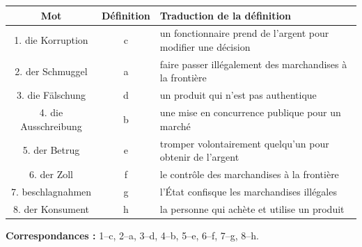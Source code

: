 \documentclass[11pt]{article}
\begin{document}
\begin{corrige}
\begin{center}
\begin{tabular}{|c|c|l|}
\hline
\rowcolor{popblueL} Mot & Définition & Traduction de la définition \\
\hline
1. die Korruption & c & un fonctionnaire prend de l'argent pour modifier une décision \\
\hline
2. der Schmuggel & a & faire passer illégalement des marchandises à la frontière \\
\hline
3. die Fälschung & d & un produit qui n'est pas authentique \\
\hline
4. die Ausschreibung & b & une mise en concurrence publique pour un marché \\
\hline
5. der Betrug & e & tromper volontairement quelqu'un pour obtenir de l'argent \\
\hline
6. der Zoll & f & le contrôle des marchandises à la frontière \\
\hline
7. beschlagnahmen & g & l'État confisque les marchandises illégales \\
\hline
8. der Konsument & h & la personne qui achète et utilise un produit \\
\hline
\end{tabular}
\end{center}
\textbf{Correspondances :} 1--c, 2--a, 3--d, 4--b, 5--e, 6--f, 7--g, 8--h.
\end{corrige}
\end{document}
